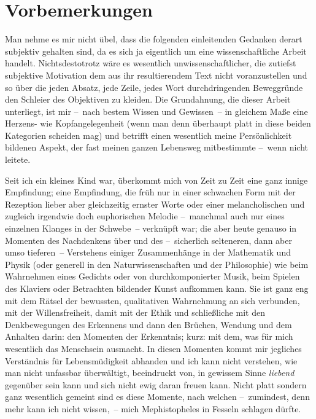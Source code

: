 \chapter*{Vorbemerkungen}\label{ch:introduction}

Man nehme es mir nicht übel, dass die folgenden einleitenden Gedanken derart
  subjektiv gehalten sind, da es sich ja eigentlich um eine wissenschaftliche Arbeit
  handelt.
Nichtsdestotrotz wäre es wesentlich unwissenschaftlicher, die zutiefst
  subjektive Motivation dem aus ihr resultierendem Text nicht voranzustellen
  und so über die jeden Absatz, jede Zeile, jedes Wort durchdringenden
  Beweggründe den Schleier des Objektiven zu kleiden.
Die Grundahnung, die dieser Arbeit unterliegt, ist mir --~nach bestem Wissen
  und Gewissen~-- in gleichem Maße eine Herzens- wie Kopfangelegenheit (wenn
  man denn überhaupt platt in diese beiden Kategorien scheiden mag)
  und betrifft einen wesentlich meine Persönlichkeit bildenen 
  Aspekt, der fast meinen ganzen Lebensweg mitbestimmte --~wenn nicht leitete.

Seit ich ein kleines Kind war, überkommt mich von Zeit zu Zeit eine ganz
  innige Empfindung; eine Empfindung, die früh nur in einer schwachen Form 
  mit der Rezeption lieber aber gleichzeitig ernster Worte oder einer
  melancholischen und zugleich irgendwie doch euphorischen Melodie --~manchmal
  auch nur eines einzelnen Klanges in der Schwebe~-- verknüpft war;
  die aber heute genauso in Momenten des Nachdenkens über und des
  --~sicherlich selteneren, dann aber umso tieferen~-- Verstehens einiger
  Zusammenhänge in der Mathematik und Physik (oder generell in den
  Naturwissenschaften und der Philosophie) wie beim Wahrnehmen eines Gedichts
  oder von durchkomponierter Musik, beim Spielen des Klaviers oder Betrachten
  bildender Kunst aufkommen kann.
Sie ist ganz eng mit dem Rätsel der bewussten, qualitativen Wahrnehmung an sich
  verbunden, mit der Willensfreiheit, damit mit der Ethik und schließliche mit
  den Denkbewegungen des Erkennens und dann den Brüchen, Wendung und dem
  Anhalten darin: den Momenten der Erkenntnis; kurz: mit dem, was für mich
  wesentlich das Menschsein ausmacht.
In diesen Momenten kommt mir jegliches Verständnis für Lebensmüdigkeit
  abhanden und ich kann nicht verstehen, wie man nicht unfassbar überwältigt,
  beeindruckt von, in gewissem Sinne \emph{liebend}  gegenüber sein
  kann und sich nicht ewig daran freuen kann.
Nicht platt sondern ganz wesentlich gemeint sind es diese Momente, nach welchen
  --~zumindest, denn mehr kann ich nicht wissen,~-- mich Mephistopheles in
  Fesseln schlagen dürfte.

